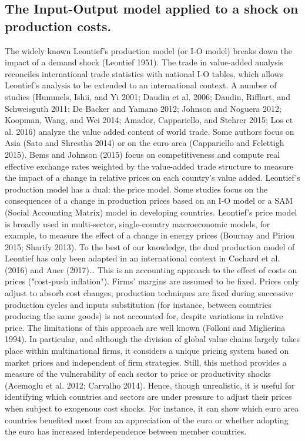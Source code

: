 \documentclass[11pt,a4paper]{article}
\begin{document}
\subsection{The Input-Output model applied to a shock on production costs.}
\label{subsec:io}
The widely known Leontief's production model (or I-O model) breaks down the impact of a demand shock (Leontief 1951). The trade in value-added analysis reconciles international trade statistics with national I-O tables, which allows Leontief's analysis to be extended to an international context. A number of studies (Hummels, Ishii, and Yi 2001; Daudin et al. 2006; Daudin, Rifflart, and Schweisguth 2011; De Backer and Yamano 2012; Johnson and Noguera 2012; Koopman, Wang, and Wei 2014; Amador, Cappariello, and Stehrer 2015; Los et al. 2016) analyze the value added content of world trade. Some authors focus on Asia (Sato and Shrestha 2014) or on the euro area (Cappariello and Felettigh 2015). Bems and Johnson (2015) focus on competitiveness and compute real effective exchange rates weighted by the value-added trade structure to measure the impact of a change in relative prices on each country's value added.
Leontief's production model has a dual: the price model. Some studies focus on the consequences of a change in production prices based on an I-O model or a SAM (Social Accounting Matrix) model in developing countries. Leontief's price model is broadly used in multi-sector, single-country macroeconomic models, for example, to measure the effect of a change in energy prices (Bournay and Piriou 2015; Sharify 2013). To the best of our knowledge, the dual production model of Leontief has only been adapted in an international context in Cochard et al. (2016) and Auer (2017)…
This is an accounting approach to the effect of costs on prices ("cost-push inflation"). Firms’ margins are assumed to be fixed. Prices only adjust to absorb cost changes, production techniques are fixed during successive production cycles and inputs substitution (for instance, between countries producing the same goods) is not accounted for, despite variations in relative price. The limitations of this approach are well known (Folloni and Miglierina 1994). In particular, and although the division of global value chains largely takes place within multinational firms, it considers a unique pricing system based on market prices and independent of firm strategies. Still, this method provides a measure of the vulnerability of each sector to price or productivity shocks (Acemoglu et al. 2012; Carvalho 2014). Hence, though unrealistic, it is useful for identifying which countries and sectors are under pressure to adjust their prices when subject to exogenous cost shocks. For instance, it can show which euro area countries benefited most from an appreciation of the euro or whether adopting the euro has increased interdependence between member countries.
\end{document}

